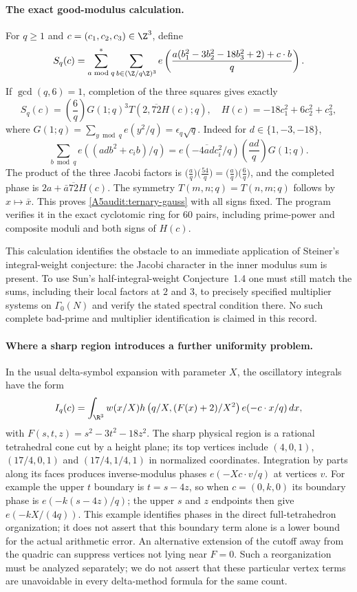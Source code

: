 \paragraph{The exact good-modulus calculation.}
For $q\geq1$ and $c=(c_1,c_2,c_3)\in\Z^3$, define
\[
 S_q(c)=\sum_{a\bmod q}^{*}\sum_{b\in(\Z/q\Z)^3}
 e\left(\frac{a(b_1^2-3b_2^2-18b_3^2+2)+c\cdot b}{q}\right).
\]
If $\gcd(q,6)=1$, completion of the three squares gives exactly
\begin{equation}\label{A5audit:ternary-gauss}
 S_q(c)=\left(\frac6q\right)G(1;q)^3
 T(2,\overline{72}H(c);q),
 \quad H(c)=-18c_1^2+6c_2^2+c_3^2,
\end{equation}
where $G(1;q)=\sum_{y\bmod q}e(y^2/q)=\epsilon_q\sqrt q$.
Indeed for $d\in\{1,-3,-18\}$,
\[
 \sum_{b\bmod q}e((ad b^2+c_i b)/q)
 =e(-\overline{4ad}c_i^2/q)
  \left(\frac{ad}{q}\right)G(1;q).
\]
The product of the three Jacobi factors is
$\bigl(\frac a q\bigr)\bigl(\frac{54}q\bigr)
=\bigl(\frac a q\bigr)\bigl(\frac6q\bigr)$, and the completed
phase is $2a+\bar a\overline{72}H(c)$.
The symmetry $T(m,n;q)=T(n,m;q)$ follows by $x\mapsto\bar x$.
This proves \eqref{A5audit:ternary-gauss} with all signs fixed.
The program  verifies it in the exact
cyclotomic ring for 60 pairs, including prime-power and composite
moduli and both signs of $H(c)$.

This calculation identifies the obstacle to an immediate application
of Steiner's integral-weight conjecture: the Jacobi character in the
inner modulus sum is present.  To use Sun's half-integral-weight
Conjecture~1.4 one must still match the sums, including their local
factors at $2$ and $3$, to precisely specified multiplier systems on
$\Gamma_0(N)$ and verify the stated spectral condition there.
No such complete bad-prime and multiplier identification is claimed
in this record.

\paragraph{Where a sharp region introduces a further uniformity problem.}
In the usual delta-symbol expansion with parameter $X$, the
oscillatory integrals have the form
\[
 I_q(c)=\int_{\R^3}w(x/X)
 h\left(q/X,(F(x)+2)/X^2\right)e(-c\cdot x/q)\,dx,
\]
with $F(s,t,z)=s^2-3t^2-18z^2$.
The sharp physical region is a rational tetrahedral cone cut by a
height plane; its top vertices include
$(4,0,1)$, $(17/4,0,1)$ and $(17/4,1/4,1)$ in normalized coordinates.
Integration by parts along its faces produces inverse-modulus phases
$e(-Xc\cdot v/q)$ at vertices $v$.
For example the upper $t$ boundary is $t=s-4z$, so when
$c=(0,k,0)$ its boundary phase is $e(-k(s-4z)/q)$; the upper
$s$ and $z$ endpoints then give $e(-kX/(4q))$.
This example identifies phases in the direct full-tetrahedron
organization; it does not assert that this boundary term alone is a
lower bound for the actual arithmetic error.  An alternative extension
of the cutoff away from the quadric can suppress vertices not lying
near $F=0$.  Such a reorganization must be analyzed separately; we do
not assert that these particular vertex terms are unavoidable in every
delta-method formula for the same count.

